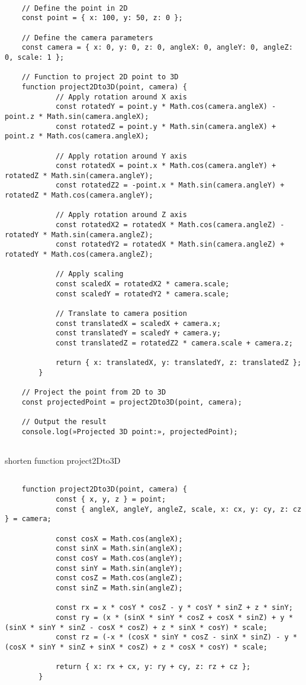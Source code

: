 \begin{lstlisting}[numbers=none]
	
	// Define the point in 2D
	const point = { x: 100, y: 50, z: 0 };

	// Define the camera parameters
	const camera = { x: 0, y: 0, z: 0, angleX: 0, angleY: 0, angleZ: 0, scale: 1 };

	// Function to project 2D point to 3D
	function project2Dto3D(point, camera) {
			// Apply rotation around X axis
			const rotatedY = point.y * Math.cos(camera.angleX) - point.z * Math.sin(camera.angleX);
			const rotatedZ = point.y * Math.sin(camera.angleX) + point.z * Math.cos(camera.angleX);

			// Apply rotation around Y axis
			const rotatedX = point.x * Math.cos(camera.angleY) + rotatedZ * Math.sin(camera.angleY);
			const rotatedZ2 = -point.x * Math.sin(camera.angleY) + rotatedZ * Math.cos(camera.angleY);

			// Apply rotation around Z axis
			const rotatedX2 = rotatedX * Math.cos(camera.angleZ) - rotatedY * Math.sin(camera.angleZ);
			const rotatedY2 = rotatedX * Math.sin(camera.angleZ) + rotatedY * Math.cos(camera.angleZ);

			// Apply scaling
			const scaledX = rotatedX2 * camera.scale;
			const scaledY = rotatedY2 * camera.scale;

			// Translate to camera position
			const translatedX = scaledX + camera.x;
			const translatedY = scaledY + camera.y;
			const translatedZ = rotatedZ2 * camera.scale + camera.z;

			return { x: translatedX, y: translatedY, z: translatedZ };
		}

	// Project the point from 2D to 3D
	const projectedPoint = project2Dto3D(point, camera);

	// Output the result
	console.log(»Projected 3D point:», projectedPoint);
	
\end{lstlisting}

\begin{leftBox}
	shorten function project2Dto3D
\end{leftBox}

\begin{lstlisting}[numbers=none]
	
	function project2Dto3D(point, camera) {
			const { x, y, z } = point;
			const { angleX, angleY, angleZ, scale, x: cx, y: cy, z: cz } = camera;

			const cosX = Math.cos(angleX);
			const sinX = Math.sin(angleX);
			const cosY = Math.cos(angleY);
			const sinY = Math.sin(angleY);
			const cosZ = Math.cos(angleZ);
			const sinZ = Math.sin(angleZ);

			const rx = x * cosY * cosZ - y * cosY * sinZ + z * sinY;
			const ry = (x * (sinX * sinY * cosZ + cosX * sinZ) + y * (sinX * sinY * sinZ - cosX * cosZ) + z * sinX * cosY) * scale;
			const rz = (-x * (cosX * sinY * cosZ - sinX * sinZ) - y * (cosX * sinY * sinZ + sinX * cosZ) + z * cosX * cosY) * scale;

			return { x: rx + cx, y: ry + cy, z: rz + cz };
		}
	
\end{lstlisting}



